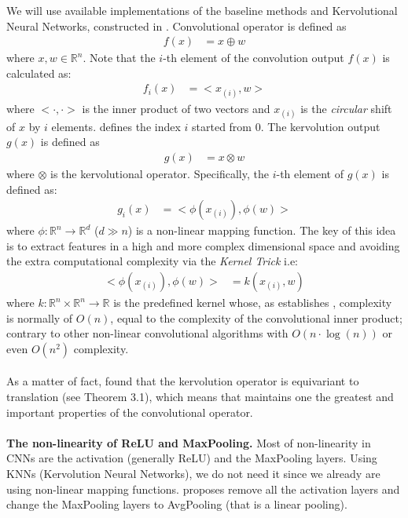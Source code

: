 \documentclass{article}
\begin{document}
We will use available implementations of the baseline methods and Kervolutional Neural Networks, constructed in \cite{DBLP:journals/corr/abs-1904-03955}. Convolutional operator is defined as
\begin{align*}
    f(x) &= x \oplus w
\end{align*}
where $x,w \in \mathbb{R}^n$. Note that the $i$-th element of the convolution output $f(x)$ is calculated as:
\begin{align*}
    f_i(x) &= <x_{(i)}, w>
\end{align*}
where $<\cdot,\cdot>$ is the inner product of two vectors and $x_{(i)}$
is the \textit{circular} shift of $x$ by $i$ elements. \cite{DBLP:journals/corr/abs-1904-03955} defines the index $i$
started from $0$. The kervolution output $g(x)$ is defined as
\begin{align*}
    g(x)&= x \otimes w 
\end{align*}
where $\otimes $ is the kervolutional operator. Specifically, the $i$-th
element of $g(x)$ is defined as:
\begin{align*}
    g_i(x) &=  <\phi(x_{(i)}),\phi(w)>
\end{align*}
where $\phi: \mathbb{R}^n \to \mathbb{R}^d$ ($d \gg n$) is a non-linear mapping
function. The key of this idea is to extract features in a high and more complex dimensional space and avoiding the extra computational complexity via the \textit{Kernel Trick} i.e:
\begin{align*}
    <\phi(x_{(i)}),\phi(w)> &= k(x_{(i)}, w)
\end{align*}
where $k: \mathbb{R}^n \times \mathbb{R}^n \to \mathbb{R}$ is the predefined kernel whose, as establishes \cite{DBLP:journals/corr/abs-1904-03955},
complexity is normally of $O(n)$, equal to the complexity of the convolutional inner product; contrary to other non-linear convolutional algorithms with $O(n\cdot \log(n))$ or even $O(n^2)$ complexity.\\
\\
As a matter of fact, \cite{DBLP:journals/corr/abs-1904-03955} found that the kervolution operator is equivariant to translation (see Theorem 3.1), which means that maintains one the greatest and important properties of the convolutional operator.\\
\\
 \textbf{The non-linearity of ReLU and MaxPooling.} Most of non-linearity in CNNs are the activation (generally ReLU) and the MaxPooling layers. Using KNNs (Kervolution Neural Networks), we do not need it since we already are using non-linear mapping functions. \cite{DBLP:journals/corr/abs-1904-03955} proposes remove all the activation layers and change the MaxPooling layers to AvgPooling (that is a linear pooling). 
\end{document}
